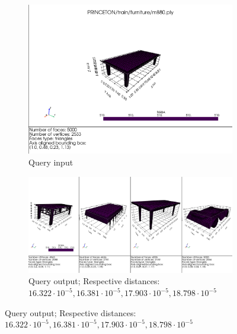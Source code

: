 \begin{figure}[H]
    \begin{subfigure}[b]{0.3\textwidth}
        \includegraphics[width=\textwidth]{assets/queries/furniture/input.png}
        \caption{Query input}
        \label{fig:query-input-knn-2}
    \end{subfigure}
    \hfill
    \begin{subfigure}[b]{0.65\textwidth}
        \includegraphics[width=\textwidth]{assets/queries/furniture/output.png}
        \caption{Query output; Respective distances: $ 16.322\cdot10^{-5}, 16.381\cdot10^{-5}, 17.903\cdot10^{-5}, 18.798\cdot10^{-5}$}
        \label{fig:query-output-knn-2}
    \end{subfigure}
    \hfill
    

\end{figure}
